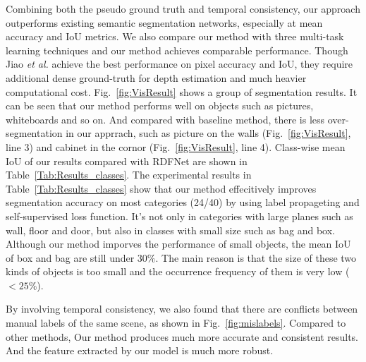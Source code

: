 Combining both the pseudo ground truth and temporal consistency, our approach outperforms existing semantic segmentation networks, especially at mean accuracy and IoU metrics. 
%
We also compare our method with three multi-task learning techniques and our method achieves comparable performance.
%
Though Jiao \emph{et al.} achieve the best performance on pixel accuracy and IoU, they require additional dense ground-truth for depth estimation and much heavier computational cost.
%
Fig.~\ref{fig:VisResult} shows a group of segmentation results. It can be seen that our method performs well on objects such as pictures, whiteboards and so on. 
%
And compared with baseline method, there is less over-segmentation in our apprrach, such as picture on the walls (Fig.~\ref{fig:VisResult}, line 3) and cabinet in the cornor (Fig.~\ref{fig:VisResult}, line 4).
%
Class-wise mean IoU of our results compared with RDFNet\cite{Park2017} are shown in Table~\ref{Tab:Results_classes}.
%
The experimental results in Table~\ref{Tab:Results_classes} show that our method effecitively improves segmentation accuracy on most categories (24/40) by using label propageting and self-supervised loss function.
%
It's not only in categories with large planes such as wall, floor and door, but also 
in classes with small size such as bag and box. 
%
Although our method imporves the performance of small objects, the mean IoU of box and bag are still under $30\%$. 
%
The main reason is that the size of these two kinds of objects is too small and the occurrence frequency of them is very low ($<25\%$).
%

 By involving temporal consistency, we also found that there are conflicts between manual labels of the same scene, as shown in Fig.~\ref{fig:mislabels}. 
%
Compared to other methods, Our method produces much more accurate and consistent results.
%
And the feature extracted by our model is much more robust.
%
%


